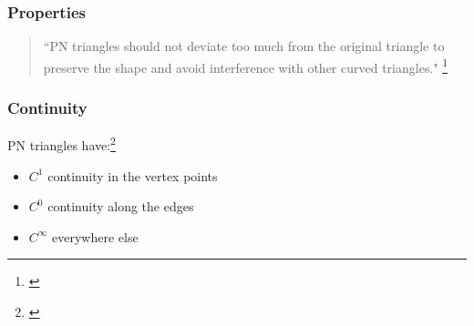 
\begin{frame}\frametitle{Properties}
	\begin{quote}
		``PN triangles should not deviate too much from the original triangle to preserve the shape and avoid interference with other curved triangles."
		\footnote{\citeauthor{vlachos2001curved}}
	\end{quote}
\end{frame}

\begin{frame}\frametitle{Continuity}	
	PN triangles have:\footnote{\citeauthor{jiao2005parallel}}
	\begin{itemize}
		\item $C^1$ continuity in the vertex points
		\item $C^0$ continuity along the edges
		\item $C^\infty$ everywhere else
	\end{itemize}
\end{frame}

